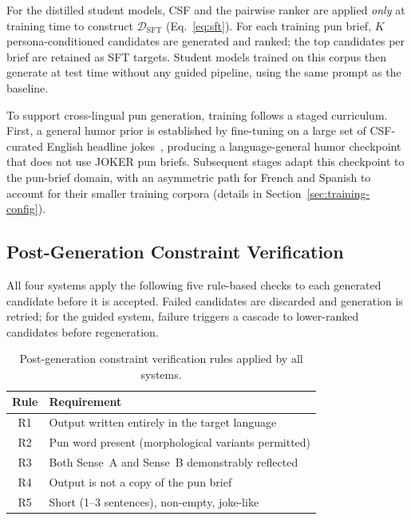 \documentclass[]{ceurart}
\begin{document}
For the distilled student models, CSF and the pairwise ranker are applied
\emph{only} at training time to construct $\mathcal{D}_{\mathrm{SFT}}$
(Eq.~\ref{eq:sft}).
For each training pun brief, $K$ persona-conditioned candidates are generated
and ranked; the top candidates per brief are retained as SFT targets.
Student models trained on this corpus then generate at test time without any
guided pipeline, using the same prompt as the baseline.

To support cross-lingual pun generation, training follows a staged curriculum.
First, a general humor prior is established by fine-tuning on a large set of
CSF-curated English headline jokes~\cite{ajayi2026humorgen,semeval2026mwahaha},
producing a language-general humor checkpoint that does not use JOKER pun briefs.
Subsequent stages adapt this checkpoint to the pun-brief domain, with an
asymmetric path for French and Spanish to account for their smaller training
corpora (details in Section~\ref{sec:training-config}).

\subsection{Post-Generation Constraint Verification}
\label{sec:verification}

All four systems apply the following five rule-based checks to each generated
candidate before it is accepted.
Failed candidates are discarded and generation is retried; for the guided system,
failure triggers a cascade to lower-ranked candidates before regeneration.

\begin{table}[h]
  \caption{Post-generation constraint verification rules applied by all systems.}
  \label{tab:verification}
  \small
  \begin{tabular}{cl}
    \toprule
    Rule & Requirement \\
    \midrule
    R1 & Output written entirely in the target language \\
    R2 & Pun word present (morphological variants permitted) \\
    R3 & Both Sense~A and Sense~B demonstrably reflected \\
    R4 & Output is not a copy of the pun brief \\
    R5 & Short (1--3 sentences), non-empty, joke-like \\
    \bottomrule
  \end{tabular}
\end{table}
\end{document}
